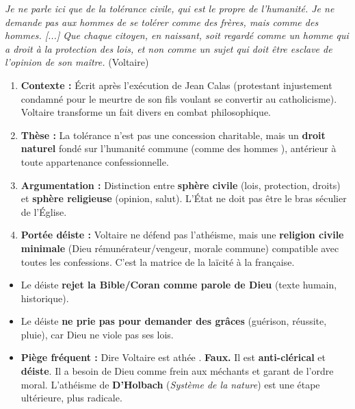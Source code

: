 \documentclass[11pt]{article}
\newcommand{\cle}[1]{{\popxbold\color{popdark}#1}}
\begin{document}
\begin{experience}
\guillemotleft \emph{Je ne parle ici que de la tolérance civile, qui est le propre de l'humanité. Je ne demande pas aux hommes de se tolérer comme des frères, mais comme des hommes. [...] Que chaque citoyen, en naissant, soit regardé comme un homme qui a droit à la protection des lois, et non comme un sujet qui doit être esclave de l'opinion de son maître.} \guillemotright (Voltaire)

\begin{enumerate}
    \item \textbf{Contexte :} Écrit après l'exécution de Jean Calas (protestant injustement condamné pour le meurtre de son fils voulant se convertir au catholicisme). Voltaire transforme un fait divers en combat philosophique.
    \item \textbf{Thèse :} La \cle{tolérance} n'est pas une concession charitable, mais un \textbf{droit naturel} fondé sur l'humanité commune (\guillemotleft comme des hommes \guillemotright), antérieur à toute appartenance confessionnelle.
    \item \textbf{Argumentation :} Distinction entre \textbf{sphère civile} (lois, protection, droits) et \textbf{sphère religieuse} (opinion, salut). L'État ne doit pas être le bras séculier de l'Église.
    \item \textbf{Portée déiste :} Voltaire ne défend pas l'athéisme, mais une \textbf{religion civile minimale} (Dieu rémunérateur/vengeur, morale commune) compatible avec toutes les confessions. C'est la matrice de la \cle{laïcité} à la française.
\end{enumerate}
\end{experience}

\begin{attention}
\begin{itemize}
    \item Le déiste \textbf{rejet la Bible/Coran comme parole de Dieu} (texte humain, historique).
    \item Le déiste \textbf{ne prie pas pour demander des grâces} (guérison, réussite, pluie), car Dieu ne viole pas ses lois.
    \item \textbf{Piège fréquent :} Dire \guillemotleft Voltaire est athée \guillemotright. \textbf{Faux.} Il est \textbf{anti-clérical} et \textbf{déiste}. Il a besoin de Dieu comme \guillemotleft frein aux méchants \guillemotright et garant de l'ordre moral. L'athéisme de \textbf{D'Holbach} (\emph{Système de la nature}) est une étape ultérieure, plus radicale.
\end{itemize}
\end{attention}
\end{document}
